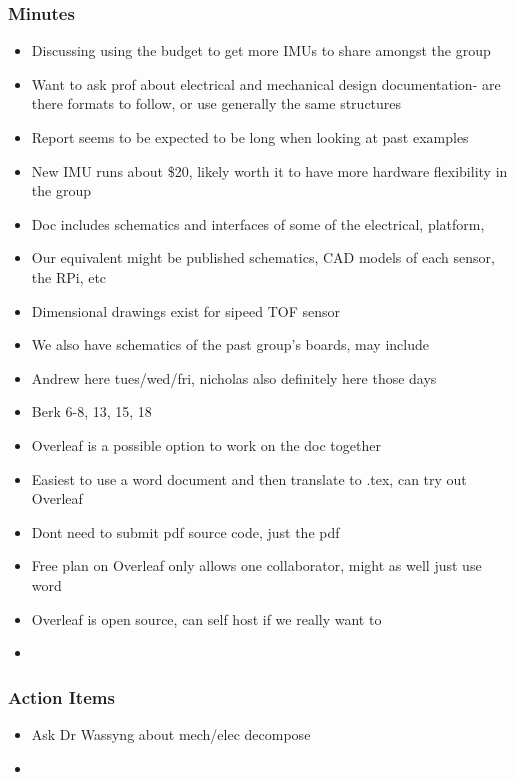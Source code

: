 		\subsubsection*{Minutes}
			\begin{itemize}
				\item Discussing using the budget to get more IMUs to share amongst the group
				\item Want to ask prof about electrical and mechanical design documentation- are there formats to follow, or use generally the same structures
				\item Report seems to be expected to be long when looking at past examples
				\item New IMU runs about \$20, likely worth it to have more hardware flexibility in the group
				\item Doc includes schematics and interfaces of some of the electrical, platform,
				\item Our equivalent might be published schematics, CAD models of each sensor, the RPi, etc 
				\item Dimensional drawings exist for sipeed TOF sensor
				\item We also have schematics of the past group's boards, may include
				\item Andrew here tues/wed/fri, nicholas also definitely here those days
				\item Berk 6-8, 13, 15, 18
				\item Overleaf is a possible option to work on the doc together
				\item Easiest to use a word document and then translate to .tex, can try out Overleaf
				\item Dont need to submit pdf source code, just the pdf
				\item Free plan on Overleaf only allows one collaborator, might as well just use word
				\item Overleaf is open source, can self host if we really want to
				\item 
			\end{itemize}

		\subsubsection*{Action Items}
			\begin{itemize}
				\item Ask Dr Wassyng about mech/elec decompose
				\item 
			\end{itemize}

